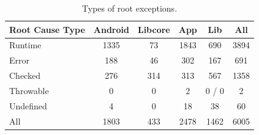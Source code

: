 \documentclass[conference]{IEEEtran}
\begin{document}
\begin{table}
\centering
\begin{tabular}{lccccc}
    \hline
    \bfseries{Root Cause Type} & \bfseries{Android} & \bfseries{Libcore} & \bfseries{App} & \bfseries{Lib}  & \bfseries{All}\\
    \hline

Runtime	&	1335	&	73	&	1843	&	690  &	3894\\
Error	       &	 188              &	 46	&	302             &	167	           &	691	\\
Checked	&	276           &	314	&	313          &	567	           &	1358	\\
Throwable	&	0	       &	0	&	2            &	0	     / 0               &	2	\\
Undefined	&	4	&	0	&	18		&	38	   &	60	\\
 \hline
All		& 1803	&	433	&	2478	&	1462	&	6005	\\
    \hline
  \end{tabular}
\caption{Types of root exceptions.}
  \label{tab:typeroottab}
\end{table}


\end{document}
